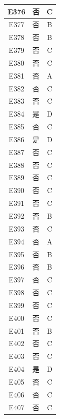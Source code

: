 \documentclass[UTF8]{ctexart}
\begin{document}
\begin{center}
\begin{longtable}{|c|c|c|}
		E376     & 否       & C        \\ \hline
		E377     & 否       & B        \\ \hline
		E378     & 否       & B        \\ \hline
		E379     & 否       & C        \\ \hline
		E380     & 否       & C        \\ \hline
		E381     & 否       & A        \\ \hline
		E382     & 否       & C        \\ \hline
		E383     & 否       & C        \\ \hline
		E384     & 是       & D        \\ \hline
		E385     & 否       & C        \\ \hline
		E386     & 是       & D        \\ \hline
		E387     & 否       & C        \\ \hline
		E388     & 否       & C        \\ \hline
		E389     & 否       & C        \\ \hline
		E390     & 否       & C        \\ \hline
		E391     & 否       & C        \\ \hline
		E392     & 否       & B        \\ \hline
		E393     & 否       & C        \\ \hline
		E394     & 否       & A        \\ \hline
		E395     & 否       & B        \\ \hline
		E396     & 否       & B        \\ \hline
		E397     & 否       & C        \\ \hline
		E398     & 否       & C        \\ \hline
		E399     & 否       & C        \\ \hline
		E400     & 否       & C        \\ \hline
		E401     & 否       & B        \\ \hline
		E402     & 否       & C        \\ \hline
		E403     & 否       & C        \\ \hline
		E404     & 是       & D        \\ \hline
		E405     & 否       & C        \\ \hline
		E406     & 否       & C        \\ \hline
		E407     & 否       & C        \\ \hline

\end{longtable}
\end{center}
\end{document}
